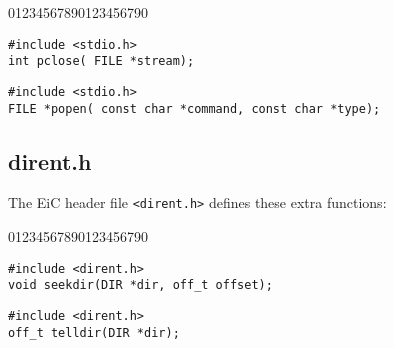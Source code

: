 \begin{Ventry2}{01234567890123456790}


\item[pclose]
\label{item:pclose}
\begin{production}
\begin{verbatim}
#include <stdio.h>
int pclose( FILE *stream);
\end{verbatim}
\end{production}

\item[popen]
\label{item:popen}
\begin{production}
\begin{verbatim}
#include <stdio.h>
FILE *popen( const char *command, const char *type);
\end{verbatim}
\end{production}

\end{Ventry2}

\subsection{dirent.h}
\label{sec:direnthImplementation}

The EiC header file \verb+<dirent.h>+ defines these extra functions:

\begin{Ventry2}{01234567890123456790}

\item[seekdir]
\label{item:seekdir}
\begin{production}
\begin{verbatim}
#include <dirent.h>
void seekdir(DIR *dir, off_t offset);
\end{verbatim}
\end{production}

\item[telldir]
\label{item:telldir}
\begin{production}
\begin{verbatim}
#include <dirent.h>
off_t telldir(DIR *dir);
\end{verbatim}
\end{production}

\end{Ventry2}













